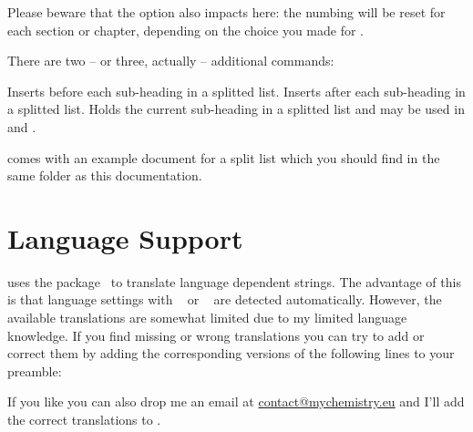 \documentclass[toc=bib,toc=index]{cnpkgdoc}
\begin{document}
Please beware that the option  also impacts here: the numbing will
be reset for each section or chapter, depending on the choice you made for
.

There are two -- or three, actually -- additional commands:
\begin{beschreibung}
  \newline
    Inserts  before each sub-heading in a splitted list.
  \newline
    Inserts  after each sub-heading in a splitted list.
  \newline
    Holds the current sub-heading in a splitted list and may be used in
     and .
\end{beschreibung}

\enotez comes with an example document for a split list which you should find
in the same folder as this documentation.


\section{Language Support}
\enotez uses the  package~\cite{pkg:translations} to
translate language dependent strings.  The advantage of this is that language
settings with ~\cite{pkg:babel} or
~\cite{pkg:polyglossia} are detected automatically.
However, the available translations are somewhat limited due to my limited
language knowledge.  If you find missing or wrong translations you can try to
add or correct them by adding the corresponding versions of the following
lines to your preamble:
\begin{beispiel}
\end{beispiel}
If you like you can also drop me an email at
\href{mailto:contact@mychemistry.eu}{contact@mychemistry.eu} and I'll add the
correct translations to \enotez.

\end{document}
